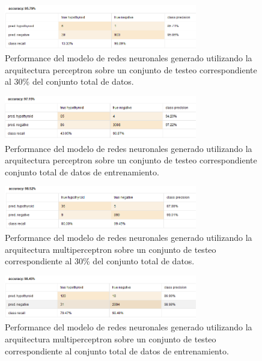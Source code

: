 \documentclass[osajnl,twocolumn,showpacs,superscriptaddress,10pt,floatfix]{revtex4-1} %
\begin{document}
\begin{figure}[h]
    \centering
    \includegraphics[width=0.75\textwidth]{models/perceptron_performance}
    \caption{Performance del modelo de redes neuronales generado utilizando la arquitectura perceptron sobre un conjunto de testeo correspondiente al 30\% del conjunto total de datos.}
    \label{figure:perceptron_performance}
\end{figure}

\begin{figure}[h]
    \centering
    \includegraphics[width=0.75\textwidth]{models/perceptron_train_test_performance}
    \caption{Performance del modelo de redes neuronales generado utilizando la arquitectura perceptron sobre un conjunto de testeo correspondiente conjunto total de datos de entrenamiento.}
    \label{figure:perceptron_train_test_performance}
\end{figure}

\begin{figure}[h]
    \centering
    \includegraphics[width=0.75\textwidth]{models/multiperceptron_performance}
    \caption{Performance del modelo de redes neuronales generado utilizando la arquitectura multiperceptron sobre un conjunto de testeo correspondiente al 30\% del conjunto total de datos.}
    \label{figure:multiperceptron_performance}
\end{figure}

\begin{figure}[h]
    \centering
    \includegraphics[width=0.75\textwidth]{models/multiperceptron_train_test_performance}
    \caption{Performance del modelo de redes neuronales generado utilizando la arquitectura multiperceptron sobre un conjunto de testeo correspondiente al conjunto total de datos de entrenamiento.}
    \label{figure:multiperceptron_train_test_performance}
\end{figure}
\end{document}
